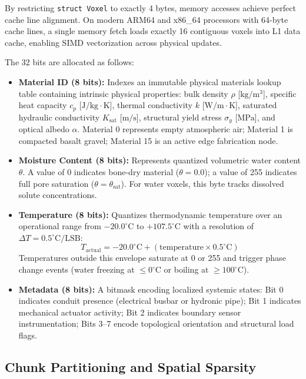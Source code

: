 By restricting \texttt{struct Voxel} to exactly 4 bytes, memory accesses achieve perfect cache line alignment. On modern ARM64 and x86\_64 processors with 64-byte cache lines, a single memory fetch loads exactly 16 contiguous voxels into L1 data cache, enabling SIMD vectorization across physical updates.

The 32 bits are allocated as follows:
\begin{itemize}
    \item \textbf{Material ID (8 bits):} Indexes an immutable physical materials lookup table containing intrinsic physical properties: bulk density $\rho$ [$\mathrm{kg/m^3}$], specific heat capacity $c_p$ [$\mathrm{J/kg\cdot K}$], thermal conductivity $k$ [$\mathrm{W/m\cdot K}$], saturated hydraulic conductivity $K_{\mathrm{sat}}$ [$\mathrm{m/s}$], structural yield stress $\sigma_y$ [$\mathrm{MPa}$], and optical albedo $\alpha$. Material 0 represents empty atmospheric air; Material 1 is compacted basalt gravel; Material 15 is an active edge fabrication node.
    \item \textbf{Moisture Content (8 bits):} Represents quantized volumetric water content $\theta$. A value of 0 indicates bone-dry material ($\theta = 0.0$); a value of 255 indicates full pore saturation ($\theta = \theta_{\mathrm{sat}}$). For water voxels, this byte tracks dissolved solute concentrations.
    \item \textbf{Temperature (8 bits):} Quantizes thermodynamic temperature over an operational range from $-20.0^\circ\mathrm{C}$ to $+107.5^\circ\mathrm{C}$ with a resolution of $\Delta T = 0.5^\circ\mathrm{C}/\mathrm{LSB}$:
    \begin{equation}
    T_{\mathrm{actual}} = -20.0^\circ\mathrm{C} + (\mathrm{temperature} \times 0.5^\circ\mathrm{C})
    \label{eq:temp_quantization}
    \end{equation}
    Temperatures outside this envelope saturate at 0 or 255 and trigger phase change events (water freezing at $\le 0^\circ\mathrm{C}$ or boiling at $\ge 100^\circ\mathrm{C}$).
    \item \textbf{Metadata (8 bits):} A bitmask encoding localized systemic states: Bit 0 indicates conduit presence (electrical busbar or hydronic pipe); Bit 1 indicates mechanical actuator activity; Bit 2 indicates boundary sensor instrumentation; Bits 3--7 encode topological orientation and structural load flags.
\end{itemize}

\subsection{Chunk Partitioning and Spatial Sparsity}

